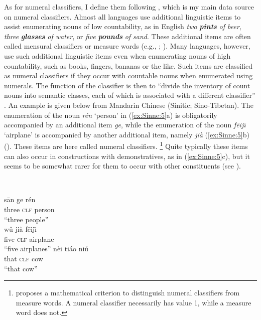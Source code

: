 \documentclass[output=collectionpaper]{langsci/langscibook}
\begin{document}
As for numeral classifiers, I define them following \citet{Gil2013}, which is my main data source on numeral classifiers. Almost all languages use additional linguistic items to assist enumerating nouns of low countability, as in English \textit{two} \textbf{\textit{pints}} \textit{of beer}, \textit{three} \textbf{\textit{glasses}} \textit{of water}, or \textit{five} \textbf{\textit{pounds}} \textit{of sand}. These additional items are often called mensural classifiers or measure words (e.g., \citealt[260--261]{Grinevald2002}; \citealt{Her2012}). Many languages, however, use such additional linguistic items even when enumerating nouns of high countability, such as books, fingers, bananas or the like. Such items are classified as numeral classifiers if they occur with countable nouns when enumerated using numerals. The function of the classifier is then to ``divide the inventory of count nouns into semantic classes, each of which is associated with a different classifier'' \citep{Gil2013}. An example is given below from Mandarin Chinese (Sinitic; Sino-Tibetan). The enumeration of the noun \textit{rén} `person' in (\ref{ex:Sinne:5}a) is obligatorily accompanied by an additional item \textit{ge}, while the enumeration of the noun \textit{f\=eij\=\i} `airplane' is accompanied by another additional item, namely \textit{jià} (\ref{ex:Sinne:5}b) (\citealt[104]{Li1981}). These items are here called numeral classifiers.%
\footnote{\citet{Her2012} proposes a mathematical criterion to distinguish numeral classifiers from measure words. A numeral classifier necessarily has value 1, while a measure word does not.} %
Quite typically these items can also occur in constructions with demonstratives, as in (\ref{ex:Sinne:5}c), but it seems to be somewhat rarer for them to occur with other constituents (see \citealt[206--220]{Aikhenvald2000}).

\ea
\label{ex:Sinne:5}
\\
\begin{xlist}
\ex
\gll s\=an ge rén\\
three \textsc{clf} person\\
\glt ``three people''\\
\ex
\gll w\v{u} jià f\=eij\=\i\\
five \textsc{clf} airplane\\
\glt ``five airplanes''
\ex
\gll nèi tiáo niú\\
that \textsc{clf} cow\\
\glt ``that cow''
\end{xlist}
\z
\end{document}
